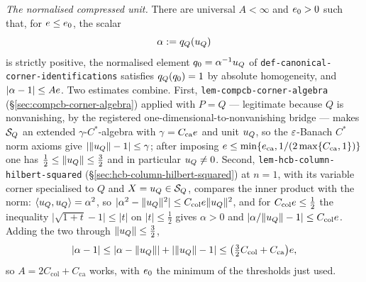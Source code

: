 \emph{The normalised compressed unit.} There are universal $A<\infty$ and $e_0>0$ such
that, for $e\le e_0$, the scalar
\begin{equation}\label{eq:cc-alpha}
  \alpha:=q_{Q}(u_{Q})
\end{equation}
is strictly positive, the normalised element $q_0=\alpha^{-1}u_{Q}$ of
\texttt{def-canonical-corner-identifications} satisfies $q_{Q}(q_0)=1$ by absolute
homogeneity, and $\lvert\alpha-1\rvert\le Ae$. Two estimates combine. First,
\texttt{lem-compcb-corner-algebra} (\S\ref{sec:compcb-corner-algebra}) applied with
$P=Q$ --- legitimate because $Q$ is nonvanishing, by the registered
one-dimensional-to-nonvanishing bridge --- makes $\mathcal S_{Q}$ an extended
$\gamma$-$C^*$-algebra with $\gamma=C_{\mathrm{ca}}e$ and unit $u_{Q}$, so the
$\varepsilon$-Banach $C^*$ norm axioms give $\lvert\lVert u_{Q}\rVert-1\rvert\le\gamma$; after
imposing $e\le\min\{e_{\mathrm{ca}},1/(2\max\{C_{\mathrm{ca}},1\})\}$ one has
$\tfrac12\le\lVert u_{Q}\rVert\le\tfrac32$ and in particular $u_{Q}\ne0$. Second,
\texttt{lem-hcb-column-hilbert-squared} (\S\ref{sec:hcb-column-hilbert-squared}) at $n=1$,
with its variable corner specialised to $Q$ and $X=u_{Q}\in\mathcal S_{Q}$, compares the
inner product with the norm: $\langle u_{Q},u_{Q}\rangle=\alpha^{2}$, so
$\lvert\alpha^{2}-\lVert u_{Q}\rVert^{2}\rvert\le C_{\mathrm{col}}e\lVert u_{Q}\rVert^{2}$,
and for $C_{\mathrm{col}}e\le\tfrac12$ the inequality
$\lvert\sqrt{1+t}-1\rvert\le\lvert t\rvert$ on $\lvert t\rvert\le\tfrac12$ gives
$\alpha>0$ and $\lvert\alpha/\lVert u_{Q}\rVert-1\rvert\le C_{\mathrm{col}}e$. Adding the
two through $\lVert u_{Q}\rVert\le\tfrac32$,
\[
  \lvert\alpha-1\rvert\le\lvert\alpha-\lVert u_{Q}\rVert\rvert+\lvert\lVert u_{Q}\rVert-1\rvert
  \le\bigl(\tfrac32C_{\mathrm{col}}+C_{\mathrm{ca}}\bigr)e,
\]
so $A=2C_{\mathrm{col}}+C_{\mathrm{ca}}$ works, with $e_0$ the minimum of the
thresholds just used.

